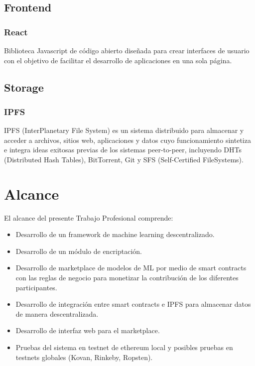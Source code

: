 \documentclass[
11pt, %
oneside, %
spanish, %
singlespacing, %
headsepline, %
chapterinoneline, %
]{MastersDoctoralThesis} %
\begin{document}
\section{Frontend}

\subsection{React \cite{rt}}
Biblioteca Javascript de código abierto diseñada para crear interfaces de usuario con el objetivo de facilitar el desarrollo de aplicaciones en una sola página. 

\section{Storage}

\subsection{IPFS \cite{ipfs}}
IPFS (InterPlanetary File System) es un sistema distribuido para almacenar y acceder a archivos, sitios web, aplicaciones y datos cuyo funcionamiento sintetiza e integra ideas exitosas previas de los sistemas peer-to-peer, incluyendo DHTs (Distributed Hash Tables),  BitTorrent, Git y SFS (Self-Certified FileSystems).

\chapter{Alcance}
El alcance del presente Trabajo Profesional comprende:

\begin{itemize}
\item Desarrollo de un framework de machine learning descentralizado.
\item Desarrollo de un módulo de encriptación.
\item Desarrollo de marketplace de modelos de ML por medio de smart contracts con las reglas de negocio para monetizar la contribución de los diferentes participantes.
\item Desarrollo de integración entre smart contracts e IPFS para almacenar datos de manera descentralizada.
\item Desarrollo de interfaz web para el marketplace.
\item Pruebas del sistema en testnet de ethereum local y posibles pruebas en testnets globales (Kovan, Rinkeby, Ropsten).
\end{itemize}
\end{document}
